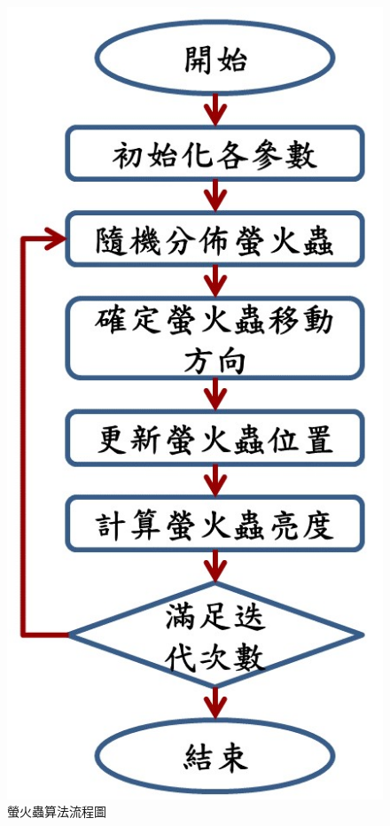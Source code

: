 \documentclass[14pt,a4paper]{report}  %
\begin{document}
        \begin{figure}[hbt!]
        \centering
        \includegraphics[scale=0.4]{螢火蟲算法.jpg} 
        \caption{螢火蟲算法流程圖}
        \label{fig:scale}
        \end{figure}
        
\end{document}
